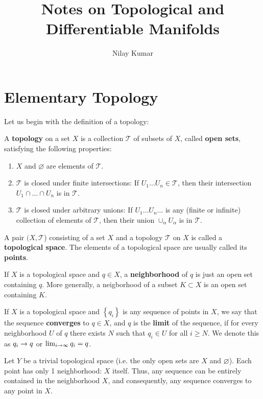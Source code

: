 \documentclass{mathnotes}
\title{Notes on Topological and Differentiable Manifolds}
\author{Nilay Kumar}
\date {}
\begin{document}
\maketitle

\section{Elementary Topology}

Let us begin with the definition of a topology:
\begin{defn}
    A \textbf{topology} on a set $X$ is a collection $\mathcal{T}$ of subsets of $X$, called \textbf{open sets},
    satisfying the following properties:
    \begin{enumerate}
        \item $X$ and $\varnothing$ are elements of $\mathcal{T}$.
        \item $\mathcal{T}$ is closed under finite intersections: If $U_1\dots U_n\in\mathcal{T}$, then their intersection
            $U_1\cap\dots\cap U_n$ is in $\mathcal{T}$.
        \item $\mathcal{T}$ is closed under arbitrary unions: If $U_1\dots U_n\dots$ is any (finite or infinite) collection
            of elements of $\mathcal{T}$, then their union $\cup_\alpha U_\alpha$ is in $\mathcal{T}$.
    \end{enumerate}
    A pair $(X,\mathcal{T}$) consisting of a set $X$ and a topology $\mathcal{T}$ on $X$ is called a \textbf{topological space}.
    The elements of a topological space are usually called its \textbf{points}.
\end{defn}

\begin{defn}
    If $X$ is a topological space and $q\in X$, a \textbf{neighborhood} of $q$ is just an open set containing $q$. More generally, a neigborhood
    of a subset $K\subset X$ is an open set containing $K$.
\end{defn}

\begin{defn}
    If $X$ is a topological space and $\left\{ q_i \right\}$ is any sequence of points in $X$, we say that the sequence \textbf{converges} to $q\in X$, and
    $q$ is the \textbf{limit} of the sequence, if for every neighborhood $U$ of $q$ there exists $N$ such that $q_i\in U$ for all $i\geq N$. We denote this as
    $q_i\rightarrow q$ or $\lim_{i\rightarrow\infty}q_i=q$.
\end{defn}

\begin{exmp}
    Let $Y$ be a trivial topological space (i.e. the only open sets are $X$ and $\varnothing$). Each point has only 1
    neighborhood: $X$ itself. Thus, any sequence can be entirely contained in the neighborhood $X$, and consequently, any sequence
    converges to any point in $X$.
\end{exmp}
\end{document}
